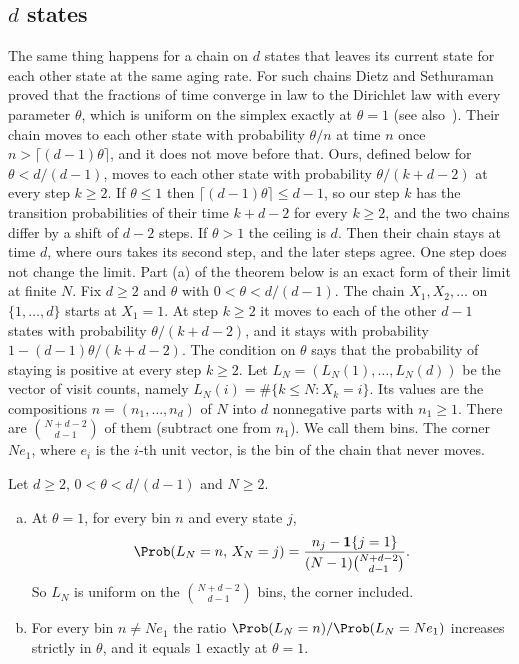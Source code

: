 \subsection{\texorpdfstring{$d$}{d} states}

The same thing happens for a chain on $d$ states that leaves its current
state for each other state at the same aging rate. For such chains Dietz and
Sethuraman~\cite[Theorem~1.4]{ds2007} proved that the fractions of time
converge in law to the Dirichlet law with every parameter $\theta$, which is
uniform on the simplex exactly at $\theta=1$ (see also~\cite{bc2018}). Their
chain moves to each other state with probability $\theta/n$ at time $n$ once
$n>\lceil(d-1)\theta\rceil$, and it does not move before that. Ours, defined
below for $\theta<d/(d-1)$, moves to each other state with probability
$\theta/(k+d-2)$ at every step $k\ge2$. If $\theta\le1$ then
$\lceil(d-1)\theta\rceil\le d-1$, so our step $k$ has the transition
probabilities of their time $k+d-2$ for every $k\ge2$, and the two chains
differ by a shift of $d-2$ steps. If $\theta>1$ the ceiling is $d$. Then
their chain stays at time $d$, where ours takes its second step, and the
later steps agree. One step does not change the limit.
Part (a) of the theorem below is an exact form of their limit at finite $N$.
Fix $d\ge2$ and $\theta$
with $0<\theta<d/(d-1)$. The chain $X_1,X_2,\dots$ on $\{1,\dots,d\}$ starts at
$X_1=1$. At step $k\ge2$ it moves to each of the other $d-1$ states with
probability $\theta/(k+d-2)$, and it stays with probability
$1-(d-1)\theta/(k+d-2)$. The condition on $\theta$ says that the probability
of staying is positive at every step $k\ge2$. Let
$L_N=(L_N(1),\dots,L_N(d))$ be the vector of visit counts, namely
$L_N(i)=\#\{k\le N:X_k=i\}$. Its values are the compositions
$n=(n_1,\dots,n_d)$ of $N$ into $d$ nonnegative parts with $n_1\ge1$. There
are $\binom{N+d-2}{d-1}$ of them (subtract one from $n_1$). We call them
bins. The corner $Ne_1$, where $e_i$ is the $i$-th unit vector, is the bin of
the chain that never moves.

\begin{theorem}[$d$ states]\label{thm:aging-d}
Let $d\ge2$, $0<\theta<d/(d-1)$ and $N\ge2$.
\begin{enumerate}[(a)]
\item At $\theta=1$, for every bin $n$ and every state $j$,
\begin{equation}\label{eq:aging-d}
 \Prob(L_N=n,\,X_N=j)=\frac{n_j-\mathbf 1\{j=1\}}{(N-1)\binom{N+d-2}{d-1}} .
\end{equation}
So $L_N$ is uniform on the $\binom{N+d-2}{d-1}$ bins, the corner included.
\item For every bin $n\ne Ne_1$ the ratio $\Prob(L_N=n)/\Prob(L_N=Ne_1)$
increases strictly in $\theta$, and it equals $1$ exactly at $\theta=1$.
\end{enumerate}
\end{theorem}

